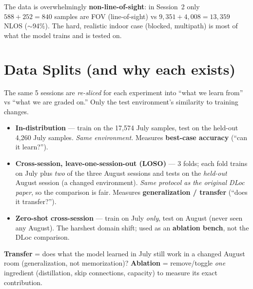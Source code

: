 \documentclass[11pt]{article}
\begin{document}
\begin{keybox}
The data is overwhelmingly \textbf{non-line-of-sight}: in Session~2 only $588+252 = 840$ samples are
FOV (line-of-sight) vs $9{,}351 + 4{,}008 = 13{,}359$ NLOS ($\sim$94\%). The hard, realistic indoor
case (blocked, multipath) is most of what the model trains and is tested on.
\end{keybox}

\section{Data Splits (and why each exists)}

The same 5 sessions are \emph{re-sliced} for each experiment into ``what we learn from'' vs ``what we
are graded on.'' Only the test environment's similarity to training changes.

\begin{itemize}[leftmargin=*]
  \item \textbf{In-distribution} --- train on the 17{,}574 July samples, test on the held-out 4{,}260
        July samples. \emph{Same environment.} Measures \textbf{best-case accuracy} (``can it learn?'').
  \item \textbf{Cross-session, leave-one-session-out (LOSO)} --- 3 folds; each fold trains on July plus
        \emph{two} of the three August sessions and tests on the \emph{held-out} August session
        (a changed environment). \emph{Same protocol as the original DLoc paper}, so the comparison is
        fair. Measures \textbf{generalization / transfer} (``does it transfer?'').
  \item \textbf{Zero-shot cross-session} --- train on July \emph{only}, test on August (never seen any
        August). The harshest domain shift; used as an \textbf{ablation bench}, not the DLoc comparison.
\end{itemize}

\begin{keybox}
\textbf{Transfer} = does what the model learned in July still work in a changed August room
(generalization, not memorization)? \quad \textbf{Ablation} = remove/toggle \emph{one} ingredient
(distillation, skip connections, capacity) to measure its exact contribution.
\end{keybox}

\end{document}

